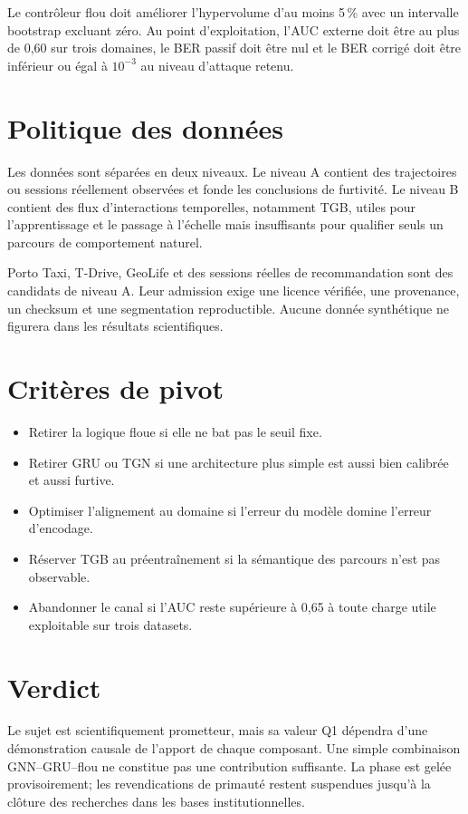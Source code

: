 \documentclass[11pt,a4paper]{article}
\begin{document}
Le contrôleur flou doit améliorer l'hypervolume d'au moins 5\,\% avec un
intervalle bootstrap excluant zéro. Au point d'exploitation, l'AUC externe
doit être au plus de 0,60 sur trois domaines, le BER passif doit être nul et
le BER corrigé doit être inférieur ou égal à \(10^{-3}\) au niveau d'attaque
retenu.

\section{Politique des données}

Les données sont séparées en deux niveaux. Le niveau A contient des
trajectoires ou sessions réellement observées et fonde les conclusions de
furtivité. Le niveau B contient des flux d'interactions temporelles, notamment
TGB, utiles pour l'apprentissage et le passage à l'échelle mais insuffisants
pour qualifier seuls un parcours de comportement naturel.

Porto Taxi, T-Drive, GeoLife et des sessions réelles de recommandation sont
des candidats de niveau A. Leur admission exige une licence vérifiée, une
provenance, un checksum et une segmentation reproductible. Aucune donnée
synthétique ne figurera dans les résultats scientifiques.

\section{Critères de pivot}

\begin{itemize}
\item Retirer la logique floue si elle ne bat pas le seuil fixe.
\item Retirer GRU ou TGN si une architecture plus simple est aussi bien
calibrée et aussi furtive.
\item Optimiser l'alignement au domaine si l'erreur du modèle domine l'erreur
d'encodage.
\item Réserver TGB au préentraînement si la sémantique des parcours n'est pas
observable.
\item Abandonner le canal si l'AUC reste supérieure à 0,65 à toute charge
utile exploitable sur trois datasets.
\end{itemize}

\section{Verdict}

Le sujet est scientifiquement prometteur, mais sa valeur Q1 dépendra d'une
démonstration causale de l'apport de chaque composant. Une simple combinaison
GNN--GRU--flou ne constitue pas une contribution suffisante. La phase est
gelée provisoirement; les revendications de primauté restent suspendues
jusqu'à la clôture des recherches dans les bases institutionnelles.
\end{document}
